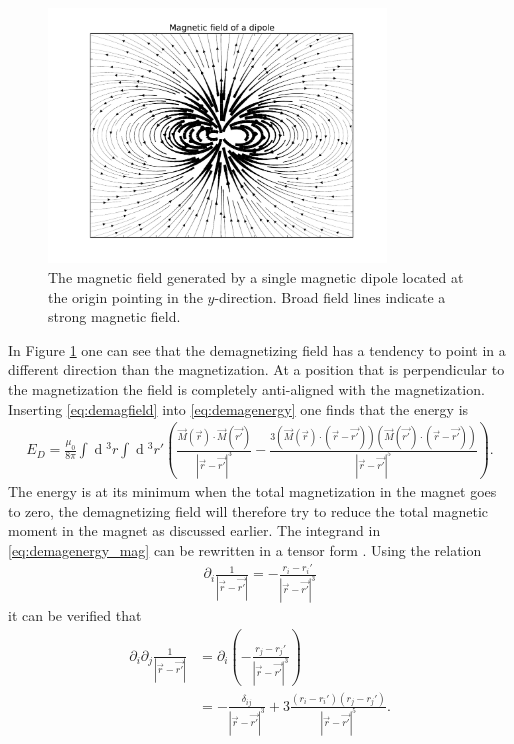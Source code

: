 \documentclass[12pt, a4paper, twoside, openright]{article}		%
\renewcommand{\d}[1]{\ensuremath{\operatorname{d}\!{#1}}}
\numberwithin{equation}{section}
\begin{document}
\begin{figure}[h!]
\begin{center}
\includegraphics[width=0.8\textwidth]{Figures/dipole_field.pdf} 
\caption{The magnetic field generated by a single magnetic dipole located at the origin pointing in the $y$-direction. Broad field lines indicate a strong magnetic field.}
\label{fig:dipole_field} 
\end{center}
\end{figure}
In Figure \ref{fig:dipole_field} one can see that the demagnetizing field has a tendency to point in a different direction than the magnetization. At a position that is perpendicular to the magnetization the field is completely anti-aligned with the magnetization. Inserting \eqref{eq:demagfield} into \eqref{eq:demagenergy} one finds that the energy is
\begin{align}
\label{eq:demagenergy_mag}
E_D = \frac{\mu_0}{8\pi} \int \d {^3}r \int \d {^3}r' (\frac{\vec{M} (\vec{r}) \cdot \vec{M} (\vec{r'})}{|\vec{r}-\vec{r'}|^3} - \frac{3(\vec{M}(\vec{r}) \cdot (\vec{r}-\vec{r'})) (\vec{M}(\vec{r'}) \cdot(\vec{r}-\vec{r'}))}{|\vec{r}-\vec{r'}|^5}).
\end{align}
The energy is at its minimum when the total magnetization in the magnet goes to zero, the demagnetizing field will therefore try to reduce the total magnetic moment in the magnet as discussed earlier. 
The integrand in \eqref{eq:demagenergy_mag} can be rewritten in a tensor form \cite{kruger2006current}. Using the relation
\begin{align}
\partial_i \frac{1}{|\vec{r}-\vec{r'}|} = -\frac{r_i-r_i'}{|\vec{r}-\vec{r'}|^3}
\end{align}
it can be verified that
\begin{align*}
\partial_i\partial_j \frac{1}{|\vec{r}-\vec{r'}|} &= \partial_i\left(-\frac{r_j-r_j'}{|\vec{r}-\vec{r'}|^3}\right) \\
&= -\frac{\delta_{ij}}{|\vec{r}-\vec{r'}|^3}+3\frac{(r_i-r_i')(r_j-r_j')}{|\vec{r}-\vec{r'}|^5}.
\end{align*}
\end{document}
